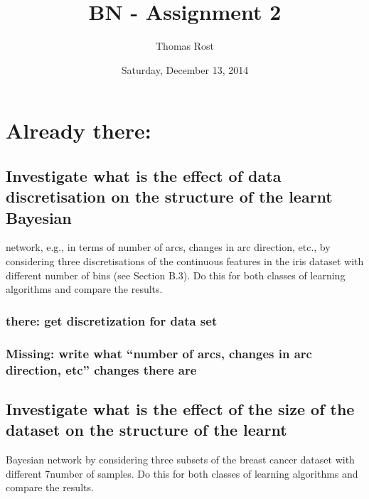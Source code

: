 \documentclass[]{article}
\title{BN - Assignment 2}
\author{Thomas Rost}
\date{Saturday, December 13, 2014}
\begin{document}
\maketitle


{
\hypersetup{linkcolor=black}
\setcounter{tocdepth}{2}
\tableofcontents
}
\newpage

\section{Already there:}\label{already-there}

\subsection{Investigate what is the effect of data discretisation on the
structure of the learnt
Bayesian}\label{investigate-what-is-the-effect-of-data-discretisation-on-the-structure-of-the-learnt-bayesian}

network, e.g., in terms of number of arcs, changes in arc direction,
etc., by considering three discretisations of the continuous features in
the iris dataset with different number of bins (see Section B.3). Do
this for both classes of learning algorithms and compare the results.

\subsubsection{there: get discretization for data
set}\label{there-get-discretization-for-data-set}

\subsubsection{Missing: write what ``number of arcs, changes in arc
direction, etc'' changes there
are}\label{missing-write-what-number-of-arcs-changes-in-arc-direction-etc-changes-there-are}

\subsection{Investigate what is the effect of the size of the dataset on
the structure of the
learnt}\label{investigate-what-is-the-effect-of-the-size-of-the-dataset-on-the-structure-of-the-learnt}

Bayesian network by considering three subsets of the breast cancer
dataset with different 7number of samples. Do this for both classes of
learning algorithms and compare the results.
\end{document}
